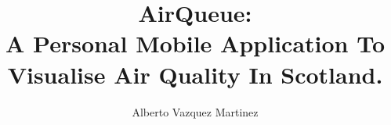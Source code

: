 \documentclass[bsc,logo, abbrevs]{infthesis}
\title{AirQueue: \protect\\ A Personal Mobile Application To Visualise Air Quality In Scotland.}
\author{Alberto Vazquez Martinez}
\begin{document}
\begin{preliminary}

\maketitle

\standarddeclaration
\dedication{Acknowledgements}
\tableofcontents
\listoffigures
\iffalse
\listoftables
\begin{accron}\end{accron}
\fi
\end{preliminary}












\end{document}
